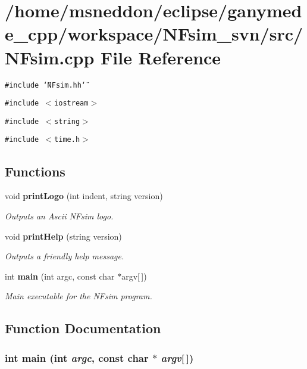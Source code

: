 \section{/home/msneddon/eclipse/ganymede\_\-cpp/workspace/NFsim\_\-svn/src/NFsim.cpp File Reference}
\label{NFsim_8cpp}


{\tt \#include \char`\"{}NFsim.hh\char`\"{}}\par
{\tt \#include $<$iostream$>$}\par
{\tt \#include $<$string$>$}\par
{\tt \#include $<$time.h$>$}\par
\subsection*{Functions}
\begin{CompactItemize}
\item 
void {\bf printLogo} (int indent, string version)
\begin{CompactList}\small\item\em Outputs an Ascii NFsim logo. \item\end{CompactList}\item 
void {\bf printHelp} (string version)
\begin{CompactList}\small\item\em Outputs a friendly help message. \item\end{CompactList}\item 
int {\bf main} (int argc, const char $\ast$argv[$\,$])
\begin{CompactList}\small\item\em Main executable for the NFsim program. \item\end{CompactList}\end{CompactItemize}


\subsection{Function Documentation}
\subsubsection{\setlength{\rightskip}{0pt plus 5cm}int main (int {\em argc}, const char $\ast$ {\em argv}[$\,$])}\label{NFsim_8cpp_c0f2228420376f4db7e1274f2b41667c}


